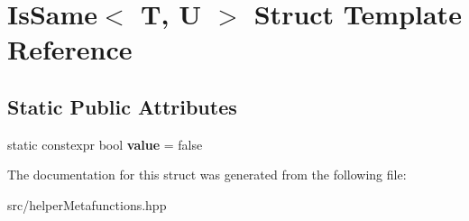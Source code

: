 \hypertarget{structIsSame}{}\section{Is\+Same$<$ T, U $>$ Struct Template Reference}
\label{structIsSame}
\subsection*{Static Public Attributes}
\begin{DoxyCompactItemize}
\item 
\mbox{\label{structIsSame_aef4b5eb9112fe839f22d6c644fc973b4}} 
static constexpr bool {\bfseries value} = false
\end{DoxyCompactItemize}


The documentation for this struct was generated from the following file\+:\begin{DoxyCompactItemize}
\item 
src/helper\+Metafunctions.\+hpp\end{DoxyCompactItemize}
